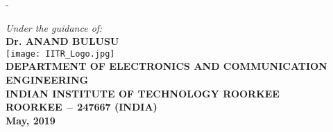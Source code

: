 \begin{titlingpage}
\begin{SingleSpace}
\begin{adjustwidth*}{\unitlength}{-\unitlength}
\begin{center}
\vspace{0 mm}
{\large \textit{Under the guidance of:}}\\
\vspace{3 mm}
{\large\textbf{Dr. ANAND BULUSU}}\\%
\vspace{8 mm}
\texttt{[image: IITR\_Logo.jpg]}\\
\vspace{8 mm}
{\large \textbf{DEPARTMENT OF ELECTRONICS AND COMMUNICATION ENGINEERING}\\}
\vspace{1mm}
{\large \textbf{INDIAN INSTITUTE OF TECHNOLOGY ROORKEE}}\\
\vspace{1mm}
{\large \textbf{ROORKEE $-$ 247667 (INDIA)}}\\
\vspace{1mm}
{\large \textbf{May, 2019}}
\end{center}
\end{adjustwidth*}
\end{SingleSpace}
\end{titlingpage} 
